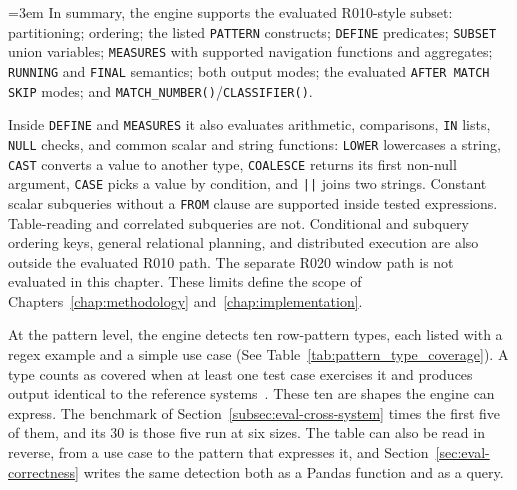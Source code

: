 {\emergencystretch=3em
In summary, the engine supports the evaluated R010-style subset:
partitioning; ordering; the listed \texttt{PATTERN}
constructs; \texttt{DEFINE} predicates; \texttt{SUBSET} union
variables; \texttt{MEASURES} with supported navigation functions and
aggregates; \texttt{RUNNING} and \texttt{FINAL} semantics; both output
modes; the evaluated \texttt{AFTER MATCH SKIP} modes; and
\texttt{MATCH\_NUMBER()}\slash\texttt{CLASSIFIER()}.\par}

Inside \texttt{DEFINE} and \texttt{MEASURES} it also evaluates
arithmetic, comparisons, \texttt{IN} lists, \texttt{NULL} checks, and
common scalar and string functions: \texttt{LOWER} lowercases a
string, \texttt{CAST} converts a value to another type,
\texttt{COALESCE} returns its first non-null argument, \texttt{CASE}
picks a value by condition, and \texttt{||} joins two strings.  Constant scalar
subqueries without a \texttt{FROM} clause are supported inside tested
expressions.  Table-reading and correlated subqueries are not.
Conditional and subquery ordering keys, general relational planning,
and distributed execution are also outside the evaluated R010 path.
The separate R020 window path is not evaluated in this chapter.
These limits define the scope of
Chapters~\ref{chap:methodology} and~\ref{chap:implementation}.

At the pattern level, the engine detects ten row-pattern types, each
listed with a regex example and a simple use case (See
Table~\ref{tab:pattern_type_coverage}).  A type counts as covered when at
least one test
case exercises it and produces output identical to the reference
systems~\cite{monierashraf2025tests}.  These ten are shapes the engine
can express.  The benchmark of Section~\ref{subsec:eval-cross-system}
times the first five of them, and its 30 is those five run at six
sizes.  The table can also be read in reverse, from a use
case to the pattern that expresses it, and
Section~\ref{sec:eval-correctness} writes the same detection both as a
Pandas function and as a query.

